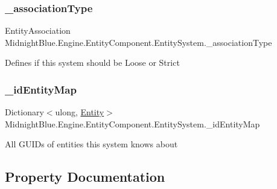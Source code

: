 \subsubsection{\texorpdfstring{\+\_\+association\+Type}{\_associationType}}
{\footnotesize\ttfamily Entity\+Association Midnight\+Blue.\+Engine.\+Entity\+Component.\+Entity\+System.\+\_\+association\+Type\hspace{0.3cm}{\ttfamily [protected]}}



Defines if this system should be Loose or Strict 

\hypertarget{class_midnight_blue_1_1_engine_1_1_entity_component_1_1_entity_system_ad1760cf695261ba2f87740d0fd1e0e8c}{}\label{class_midnight_blue_1_1_engine_1_1_entity_component_1_1_entity_system_ad1760cf695261ba2f87740d0fd1e0e8c} 
\subsubsection{\texorpdfstring{\+\_\+id\+Entity\+Map}{\_idEntityMap}}
{\footnotesize\ttfamily Dictionary$<$ulong, \hyperlink{class_midnight_blue_1_1_engine_1_1_entity_component_1_1_entity}{Entity}$>$ Midnight\+Blue.\+Engine.\+Entity\+Component.\+Entity\+System.\+\_\+id\+Entity\+Map\hspace{0.3cm}{\ttfamily [protected]}}



All G\+U\+ID\textquotesingle{}s of entities this system knows about 



\subsection{Property Documentation}
\hypertarget{class_midnight_blue_1_1_engine_1_1_entity_component_1_1_entity_system_a8c0d1a5e524e46e7c0be016ccbb3ccee}{}\label{class_midnight_blue_1_1_engine_1_1_entity_component_1_1_entity_system_a8c0d1a5e524e46e7c0be016ccbb3ccee} 
